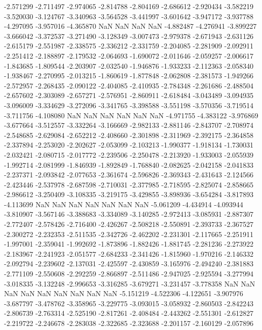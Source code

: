 -2.571299
-2.711497
-2.974065
-2.814788
-2.804169
-2.686612
-2.920434
-3.582219
-3.520030
-3.124767
-3.340963
-3.564528
-3.441997
-3.601642
-3.947172
-3.937788
-4.297095
-3.957016
-4.365870
NaN
NaN
NaN
NaN
-4.882487
-4.276941
-3.899227
-3.666042
-3.372537
-3.271490
-3.128349
-3.007473
-2.979378
-2.671943
-2.631126
-2.615179
-2.551987
-2.338575
-2.336212
-2.331759
-2.204085
-2.281909
-2.092911
-2.251412
-2.188897
-2.179532
-2.064693
-1.690072
-2.011646
-2.059257
-2.006617
-1.843685
-1.809544
-2.203907
-2.032540
-1.946876
-1.933233
-2.112363
-2.058340
-1.938467
-2.270995
-2.013215
-1.860619
-1.877848
-2.062808
-2.381573
-1.949266
-2.572957
-2.268435
-2.090122
-2.404085
-2.410935
-2.784348
-2.261686
-2.488504
-2.657602
-2.303089
-2.657271
-2.576951
-2.860911
-2.618484
-3.043489
-3.094935
-3.096009
-3.334629
-3.272096
-3.341765
-3.398588
-3.551198
-3.570356
-3.719514
-3.711756
-4.108080
NaN
NaN
NaN
NaN
NaN
NaN
-4.971755
-4.383122
-3.976869
-3.677664
-3.512557
-3.332264
-3.166669
-2.982133
-2.881146
-2.843707
-2.708974
-2.548685
-2.629084
-2.652212
-2.408660
-2.301898
-2.311969
-2.392175
-2.364858
-2.337894
-2.253020
-2.202627
-2.053099
-2.103213
-1.990377
-1.918134
-1.730031
-2.032421
-2.080715
-2.017772
-2.239506
-2.250478
-2.213920
-1.933003
-2.055939
-1.992714
-2.081999
-1.846939
-1.892849
-1.768840
-2.082625
-2.042158
-2.041833
-2.237371
-2.093842
-2.077653
-2.361674
-2.596826
-2.369343
-2.431643
-2.124566
-2.423446
-2.537978
-2.687598
-2.710031
-2.377985
-2.718595
-2.825074
-2.858665
-2.986612
-3.250409
-3.108335
-3.219175
-3.429855
-3.898936
-3.654284
-3.817893
-4.113699
NaN
NaN
NaN
NaN
NaN
NaN
NaN
-5.061209
-4.434914
-4.093944
-3.810907
-3.567146
-3.388683
-3.334089
-3.140285
-2.972413
-3.085931
-2.887307
-2.772407
-2.578426
-2.716400
-2.426267
-2.508218
-2.550891
-2.393733
-2.367527
-2.300272
-2.232353
-2.511535
-2.342726
-2.462202
-2.231301
-2.117665
-2.251911
-1.997001
-2.359041
-1.992692
-1.873896
-1.882426
-1.881745
-2.281236
-2.273922
-2.183967
-2.241923
-2.051577
-2.684233
-2.341426
-1.815960
-1.970216
-2.146332
-2.092794
-2.239602
-2.137031
-2.425597
-2.430859
-3.165976
-2.494240
-2.381883
-2.771109
-2.550608
-2.292259
-2.866897
-2.511486
-2.947025
-2.925594
-3.277994
-3.018335
-3.132248
-2.996653
-3.316285
-3.679271
-3.231457
-3.778358
NaN
NaN
NaN
NaN
NaN
NaN
NaN
NaN
NaN
-5.151219
-4.522306
-4.122651
-3.907976
-3.687797
-3.478762
-3.358965
-3.229775
-3.093015
-3.058932
-2.860503
-2.842243
-2.806739
-2.763314
-2.525190
-2.817261
-2.408484
-2.443262
-2.551301
-2.612827
-2.219722
-2.246678
-2.283038
-2.322685
-2.323688
-2.201157
-2.160129
-2.057896
